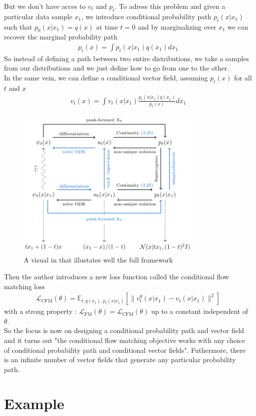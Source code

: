 \documentclass[a4paper,12pt]{article}
\begin{document}
But we don't have acces to \(v_t\) and \(p_t\). To adress this problem and given a particular data sample \(x_1\), we introduce conditional probability path \(p_t(x|x_1)\) such that \(p_0(x|x_1)=q(x)\) at time \(t=0\) and by marginalizing over \(x_1\) we can recover the marginal probability path  
\begin{align}
  p_t(x)=\int p_t(x|x_1)q(x_1)dx_1
\end{align}
So instead of defining a path between two entire distributions, we take a samples from our distributions and we just define how to go from one to the other.\\ 
In the same vein, we can define a conditional vector field, assuming \(p_t(x)\) for all \(t\) and \(x\) 
\begin{align}
  v_t(x)=\int v_t(x|x_1)\frac{p_t(x|x_1)q(x_1)}{p_t(x)}dx_1
\end{align}

\begin{figure}[h]
  \centering
  \includegraphics[width=0.8\textwidth]{FlowMatchingFramework.png}
  \caption{A visual in \cite{lipman2024flowmatchingguidecode} that illustates well the full framework}
  \label{fig:flow_matching_framework}
\end{figure}

Then the author introduces a new loss function called the conditional flow matching loss
\begin{align}
  \mathcal{L}_\text{CFM}(\theta) = \mathbb{E}_{t,q(x_1),p_t(x|x_1)}\left[\|v_t^\theta(x|x_1)-v_t(x|x_1)\|^2\right]
\end{align}
with a strong property : \(\mathcal{L}_\text{FM}(\theta)=\mathcal{L}_\text{CFM}(\theta)\) up to a constant independent of \(\theta\). \\
So the focus is now on designing a conditional probability path and vector field and it turns out "the conditional flow matching objective works with any choice of conditional probability path and conditional vector fields". Futhermore, there is an infinite number of vector fields that generate any particular probability path.\\



\section{Example}




\end{document}
